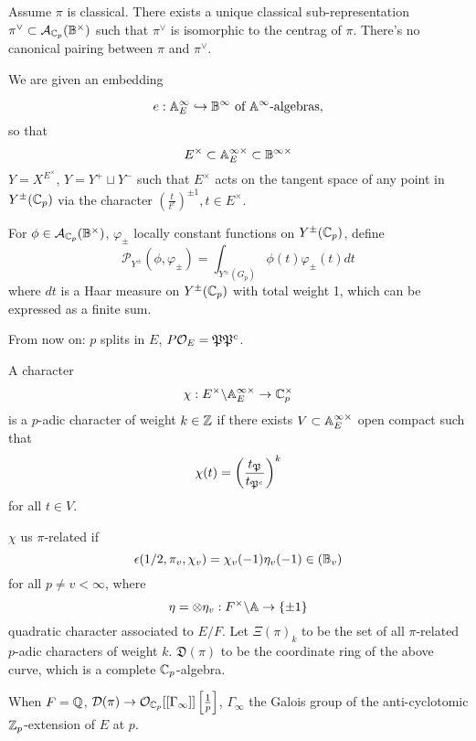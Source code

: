 \documentclass[12pt,amsfont]{amsart}
\begin{document}
\begin{rmk} Assume $\pi$ is classical. There exists a unique classical sub-representation $\pi^\vee \subset \mathcal{A}_{{\mathbb C}_p}(\mathbb{B}^\times)$ such that $\pi^\vee$ is isomorphic to the centrag of $\pi$. There's no canonical pairing between $\pi$ and $\pi^\vee$.
\end{rmk}

We are given an embedding

\[e: \mathbb{A}_E^\infty \hookrightarrow \mathbb{B}^\infty \text{ of } \mathbb{A}^\infty \text{-algebras},\]
so that
\[E^\times \subset \mathbb{A}_E^{\infty \times} \subset \mathbb{B}^{\infty \times} \]
$Y = X^{E^\times}$, $Y = Y^+ \sqcup Y^{-}$ such that $E^\times$ acts on the tangent space of any point in $Y^{\pm}({\mathbb C}_p)$ via the character $\left(\frac{t}{t^c}\right)^{\pm 1}, t \in E^\times$. 

\begin{dfn} For $\phi \in \mathcal{A}_{{\mathbb C}_p}(\mathbb{B}^\times)$, $\varphi_{\pm}$ locally constant functions on $Y^{\pm}({\mathbb C}_p)$, define
\[\mathcal{P}_{Y^\pm}(\phi, \varphi_{\pm}) = \int_{Y^\pm(G_p)} \phi(t) \varphi_{\pm}(t) dt \]
where $dt$ is a Haar measure on $Y^{\pm}({\mathbb C}_p)$ with total weight 1, which can be expressed as a finite sum. 
\end{dfn}

From now on: $p$ splits in $E$, $P\mathcal{O}_E = \mathfrak{P} \mathfrak{P}^c$.

\begin{dfn} A character 
\[ \chi : E^\times \backslash \mathbb{A}_E^{\infty \times} \rightarrow {\mathbb C}_p^\times \] is a $p$-adic character of weight $k \in {\mathbb Z}$ if there exists $V \subset \mathbb{A}_E^{\infty \times}$ open compact such that 
\[\chi(t) = \left(\frac{t_{\mathfrak{P}}}{t_{\mathfrak{P}^c}}\right)^k \]
for all $t \in V$.
\end{dfn}

$\chi$ us $\pi$-related if 
\[\epsilon(1/2, \pi_v, \chi_v) = \chi_v(-1) \eta_v(-1) \in (\mathbb{B}_v) \]
for all $p \ne v < \infty$, where 
\[ \eta = \otimes \eta_v : F^\times \backslash \mathbb{A} \rightarrow \{\pm 1\} \]
quadratic character associated to $E/F$. Let $\Xi(\pi)_k$ to be the set of all $\pi$-related $p$-adic characters of weight $k$. $\mathfrak{D}(\pi)$ to be the coordinate ring of the above curve, which is a complete ${\mathbb C}_p$-algebra. 

\begin{rmk} When $F = {\mathbb Q}$, $\mathcal{D}(\pi) \rightarrow \mathcal{O}_{{\mathbb C}_p}[[\Gamma_\infty]] \left[ \frac{1}{p}\right]$, $\Gamma_\infty$ the Galois group of the anti-cyclotomic ${\mathbb Z}_p$-extension of $E$ at $p$.
\end{rmk}
\end{document}
